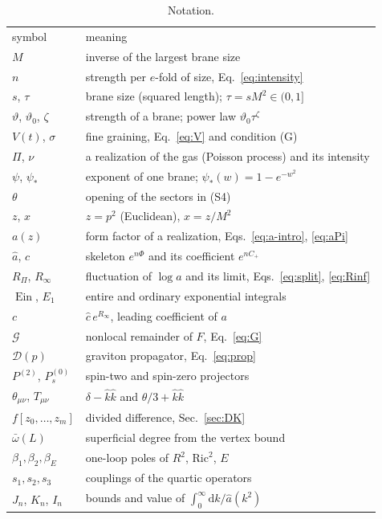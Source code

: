 \documentclass[aps,prd,10pt,twocolumn,superscriptaddress,nofootinbib,floatfix,longbibliography]{revtex4-2}
\newcommand{\dd}{\mathrm{d}}
\newcommand{\Ein}{\operatorname{Ein}}
\newcommand{\Pt}{P^{(2)}}
\newcommand{\Ps}{P^{(0)}_{s}}
\newcommand{\Ric}{\mathrm{Ric}}
\begin{document}
\begin{table}[tb]
\caption{Notation.}
\label{tab:notation}
\begin{ruledtabular}
\begin{tabular}{lp{5.6cm}}
symbol & meaning\\
\colrule
$M$ & inverse of the largest brane size\\
$n$ & strength per $e$-fold of size, Eq.~\eqref{eq:intensity}\\
$s$, $\tau$ & brane size (squared length); $\tau=sM^2\in(0,1]$\\
$\vartheta$, $\vartheta_0$, $\zeta$ & strength of a brane; power law $\vartheta_0\tau^\zeta$\\
$V(t)$, $\sigma$ & fine graining, Eq.~\eqref{eq:V} and condition (G)\\
$\Pi$, $\nu$ & a realization of the gas (Poisson process) and its intensity\\
$\psi$, $\psi_*$ & exponent of one brane; $\psi_*(w)=1-e^{-w^2}$\\
$\theta$ & opening of the sectors in (S4)\\
$z$, $x$ & $z=p^2$ (Euclidean), $x=z/M^2$\\
$a(z)$ & form factor of a realization, Eqs.~\eqref{eq:a-intro}, \eqref{eq:aPi}\\
$\hat a$, $\hat c$ & skeleton $e^{n\Phi}$ and its coefficient $e^{nC_+}$\\
$R_\Pi$, $R_\infty$ & fluctuation of $\log a$ and its limit, Eqs.~\eqref{eq:split}, \eqref{eq:Rinf}\\
$\Ein$, $E_1$ & entire and ordinary exponential integrals\\
$c$ & $\hat c\,e^{R_\infty}$, leading coefficient of $a$\\
$\mathcal G$ & nonlocal remainder of $F$, Eq.~\eqref{eq:G}\\
$\mathcal D(p)$ & graviton propagator, Eq.~\eqref{eq:prop}\\
$\Pt$, $\Ps$ & spin-two and spin-zero projectors\\
$\theta_{\mu\nu}$, $T_{\mu\nu}$ & $\delta-\hat k\hat k$ and $\theta/3+\hat k\hat k$\\
$f[z_0,\dots,z_m]$ & divided difference, Sec.~\ref{sec:DK}\\
$\bar\omega(L)$ & superficial degree from the vertex bound\\
$\beta_1,\beta_2,\beta_E$ & one-loop poles of $R^2$, $\Ric^2$, $E$\\
$s_1,s_2,s_3$ & couplings of the quartic operators\\
$J_n$, $K_n$, $I_n$ & bounds and value of $\int_0^\infty\dd k/\hat a(k^2)$\\
\end{tabular}
\end{ruledtabular}
\end{table}
\end{document}
